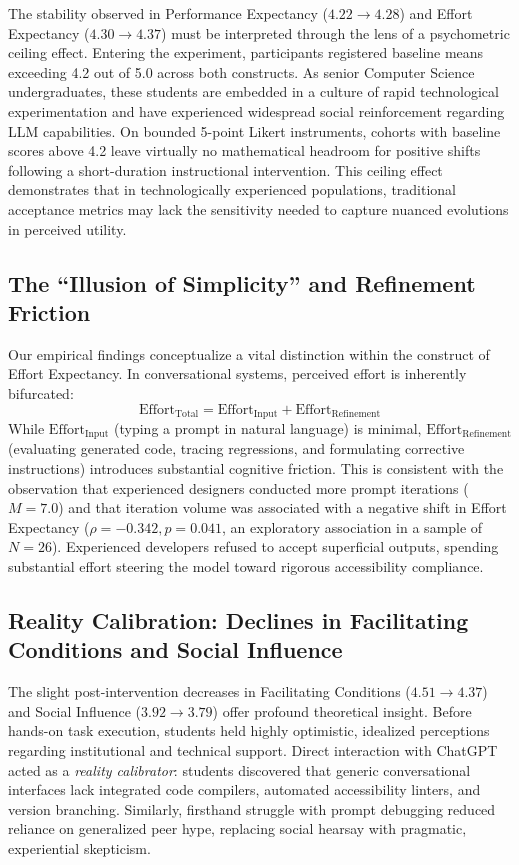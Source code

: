 \documentclass{cleiej}
\begin{document}
The stability observed in Performance Expectancy ($4.22 \to 4.28$) and Effort Expectancy ($4.30 \to 4.37$) must be interpreted through the lens of a psychometric ceiling effect. Entering the experiment, participants registered baseline means exceeding 4.2 out of 5.0 across both constructs. As senior Computer Science undergraduates, these students are embedded in a culture of rapid technological experimentation and have experienced widespread social reinforcement regarding LLM capabilities. On bounded 5-point Likert instruments, cohorts with baseline scores above 4.2 leave virtually no mathematical headroom for positive shifts following a short-duration instructional intervention. This ceiling effect demonstrates that in technologically experienced populations, traditional acceptance metrics may lack the sensitivity needed to capture nuanced evolutions in perceived utility.

\subsection{The ``Illusion of Simplicity'' and Refinement Friction}
Our empirical findings conceptualize a vital distinction within the construct of Effort Expectancy. In conversational systems, perceived effort is inherently bifurcated:
\begin{equation}
    \text{Effort}_{\text{Total}} = \text{Effort}_{\text{Input}} + \text{Effort}_{\text{Refinement}}
\end{equation}
While $\text{Effort}_{\text{Input}}$ (typing a prompt in natural language) is minimal, $\text{Effort}_{\text{Refinement}}$ (evaluating generated code, tracing regressions, and formulating corrective instructions) introduces substantial cognitive friction. This is consistent with the observation that experienced designers conducted more prompt iterations ($M = 7.0$) and that iteration volume was associated with a negative shift in Effort Expectancy ($\rho = -0.342, p = 0.041$, an exploratory association in a sample of $N=26$). Experienced developers refused to accept superficial outputs, spending substantial effort steering the model toward rigorous accessibility compliance.

\subsection{Reality Calibration: Declines in Facilitating Conditions and Social Influence}
The slight post-intervention decreases in Facilitating Conditions ($4.51 \to 4.37$) and Social Influence ($3.92 \to 3.79$) offer profound theoretical insight. Before hands-on task execution, students held highly optimistic, idealized perceptions regarding institutional and technical support. Direct interaction with ChatGPT acted as a \textit{reality calibrator}: students discovered that generic conversational interfaces lack integrated code compilers, automated accessibility linters, and version branching. Similarly, firsthand struggle with prompt debugging reduced reliance on generalized peer hype, replacing social hearsay with pragmatic, experiential skepticism.
\end{document}
